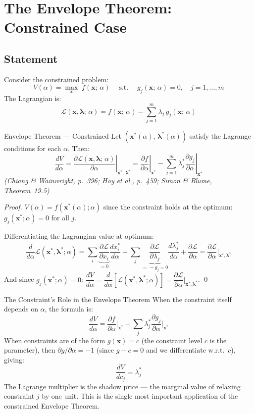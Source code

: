 \documentclass[12pt, a4paper]{article}
\theoremstyle{definition}
\newcommand{\bx}{\mathbf{x}}
\newcommand{\blambda}{\boldsymbol{\lambda}}
\newcommand{\ddd}[2]{\dfrac{d#1}{d#2}}
\newcommand{\pp}[2]{\dfrac{\partial #1}{\partial #2}}
\newcommand{\st}{\;\text{s.t.}\;}
\newcommand{\Lag}{\mathcal{L}}
\begin{document}
\section{The Envelope Theorem: Constrained Case}

\subsection{Statement}

Consider the constrained problem:
\[
  V(\alpha) = \max_{\bx}\; f(\bx;\,\alpha)
  \quad\st\quad g_j(\bx;\,\alpha) = 0,\quad j = 1,\ldots,m
\]
The Lagrangian is:
\[
  \Lag(\bx,\blambda;\,\alpha)
  = f(\bx;\,\alpha) - \sum_{j=1}^m \lambda_j\,g_j(\bx;\,\alpha)
\]

\begin{thmbox}{Envelope Theorem --- Constrained}
Let $(\bx^*(\alpha),\,\blambda^*(\alpha))$ satisfy the Lagrange conditions
for each $\alpha$. Then:
\[
  \boxed{
    \ddd{V}{\alpha}
    = \left.\pp{\Lag(\bx,\blambda;\,\alpha)}{\alpha}\right|_{\bx^*,\,\blambda^*}
    = \left.\pp{f}{\alpha}\right|_{\bx^*}
      - \sum_{j=1}^m \lambda_j^*\left.\pp{g_j}{\alpha}\right|_{\bx^*}
  }
\]
\emph{(Chiang \& Wainwright, p.\ 396; Hoy et al., p.\ 459;
Simon \& Blume, Theorem~19.5)}
\end{thmbox}

\begin{proof}
$V(\alpha) = f(\bx^*(\alpha);\alpha)$ since the constraint holds at the
optimum: $g_j(\bx^*;\alpha)=0$ for all $j$.

Differentiating the Lagrangian value at optimum:
\[
  \ddd{}{{\alpha}}\Lag(\bx^*,\blambda^*;\alpha)
  = \sum_i\underbrace{\pp{\Lag}{x_i}}_{=0}\ddd{x_i^*}{\alpha}
  + \sum_j\underbrace{\pp{\Lag}{\lambda_j}}_{=\,-g_j=0}\ddd{\lambda_j^*}{\alpha}
  + \pp{\Lag}{\alpha}
  = \pp{\Lag}{\alpha}\bigg|_{\bx^*,\blambda^*}
\]
And since $g_j(\bx^*;\alpha)=0$:
$\ddd{V}{\alpha} = \ddd{}{{\alpha}}[\Lag(\bx^*,\blambda^*;\alpha)]
= \pp{\Lag}{\alpha}\big|_{\bx^*,\blambda^*}$. \qed
\end{proof}

\begin{warnbox}{The Constraint's Role in the Envelope Theorem}
When the constraint itself depends on $\alpha$, the formula is:
\[
  \ddd{V}{\alpha}
  = \pp{f}{\alpha}\bigg|_{\bx^*}
  - \sum_j \lambda_j^* \pp{g_j}{\alpha}\bigg|_{\bx^*}
\]
When constraints are of the form $g(\bx)=c$ (the constraint level $c$ is the parameter), then $\partial g/\partial\alpha = -1$ (since $g-c=0$ and we differentiate w.r.t.\ $c$), giving:
\[
  \ddd{V}{c_j} = \lambda_j^*
\]
The Lagrange multiplier is the shadow price --- the marginal value of relaxing constraint $j$ by one unit. This is the single most important application of the constrained Envelope Theorem.
\end{warnbox}
\end{document}
